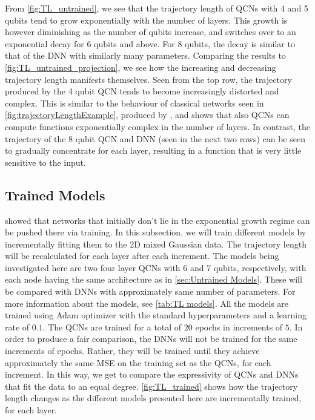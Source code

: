 
From \autoref{fig:TL_untrained}, we see that the trajectory length of QCNs with 4 and 5 qubits tend to grow exponentially with the number of layers. This growth is however diminishing as the number of qubits increase, and switches over to an exponential decay for 6 qubits and above. For 8 qubits, the decay is similar to that of the DNN with similarly many parameters. Comparing the results to \autoref{fig:TL_untrained_projection}, we see how the increasing and decreasing trajectory length manifests themselves. Seen from the top row, the trajectory produced by the 4 qubit QCN tends to become increasingly distorted and complex. This is similar to the behaviour of classical networks seen in \autoref{fig:trajectoryLengthExample}, produced by \citet{raghu2017expressive}, and shows that also QCNs can compute functions exponentially complex in the number of layers. In contrast, the trajectory of the 8 qubit QCN and DNN (seen in the next two rows) can be seen to gradually concentrate for each layer, resulting in a function that is very little sensitive to the input.  


\subsection{Trained Models}\label{sec:Trained Models}
\citet{raghu2017expressive} showed that networks that initially don't lie in the exponential growth regime can be pushed there via training. In this subsection, we will train different models by incrementally fitting them to the 2D mixed Gaussian data. The trajectory length will be recalculated for each layer after each increment. The models being investigated here are two four layer QCNs with 6 and 7 qubits, respectively, with each node having the same architecture as in \autoref{sec:Untrained Models}. These will be compared with DNNs with approximately same number of parameters. For more information about the models, see \autoref{tab:TL models}. All the models are trained using Adam optimizer with the standard hyperparameters and a learning rate of $0.1$. The QCNs are trained for a total of $20$ epochs in increments of $5$. In order to produce a fair comparison, the DNNs will not be trained for the same increments of epochs. Rather, they will be trained until they achieve approximately the same MSE on the training set as the QCNs, for each increment. In this way, we get to compare the expressivity of QCNs and DNNs that fit the data to an equal degree. \autoref{fig:TL_trained} shows how the trajectory length changes as the different models presented here are incrementally trained, for each layer. 

